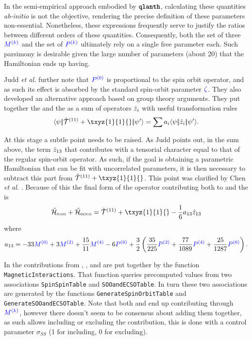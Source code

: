 \documentclass{article}
\newcommand{\codetext}[1]{{\color{BlueViolet} \texttt{#1}}}
\begin{document}
    In the semi-empirical approach embodied by $\textbf{\texttt{qlanth}}$, calculating these quantities \textit{ab-initio} is not the objective, rendering the precise definition of these parameters non-essential. Nonetheless, these expressions frequently serve to justify the ratios between different orders of these quantities. Consequently, both the set of three $\textcolor{blue}{M^{(k)}}$ and the set of $\textcolor{blue}{P^{(k)}}$ ultimately rely on a single free parameter each. Such parsimony is desirable given the large number of parameters (about 20) that the Hamiltonian ends up having.

    Judd \textit{et al.} further note that $\textcolor{blue}{P^{(0)}}$ is proportional to the spin orbit operator, and as such its effect is absorbed by the standard spin-orbit parameter $\textcolor{blue}{{\zeta}}$. They also developed an alternative approach based on group theory arguments. They put together the \soo and the \ecso as a sum of operators $\hat{z}_i$ with useful transformation rules 
    \begin{equation}
        \redbraopket{\psi}{\Txyz{1}{1}{} + \txyz{1}{1}{}}{\psi'} = \sum a_i \redbraopket{\psi}{\hat{z}_i}{\psi'}.
    \end{equation}

    At this stage a subtle point needs to be raised. As Judd points out, in the sum above, the term $\hat{z}_{13}$ that contributes with a tensorial character equal to that of the regular spin-orbit operator. As such, if the goal is obtaining a parametric Hamiltonian that can be fit with uncorrelated parameters, it is then necessary to subtract this part from $\Txyz{1}{1}{} + \txyz{1}{1}{}$. This point was clarified by Chen \textit{et al.} \cite{chen_few_2008}. Because of this the final form of the operator contributing both to \soo and the \ecso is
    \begin{equation}
        \hamSpinOtherOrbitSymbol + \hamECSOSymbol = \Txyz{1}{1}{} + \txyz{1}{1}{} - \frac{1}{6}a_{13}\op{z}_{13}
        \label{SOO ECSO sum}
    \end{equation}
    where
    \begin{equation}
        a_{13} = -33 \textcolor{blue}{M^{(0)}} + 3 \textcolor{blue}{M^{(2)}} + \frac{15}{11} \textcolor{blue}{M^{(4)}} - 6 \textcolor{blue}{P^{(0)}} + \frac{3}{2} \left(\frac{35}{225} \textcolor{blue}{P^{(2)}} + \frac{77}{1089} \textcolor{blue}{P^{(4)}} + \frac{25}{1287} \textcolor{blue}{P^{(6)}}\right).
    \end{equation}

    In \qlanth the contributions from \spinspin, \soo, and \ecso are put together by the function \codetext{MagneticInteractions}. That function queries precomputed values from two associations \codetext{SpinSpinTable} and \codetext{SOOandECSOTable}. In turn these two associations are generated by the functions \codetext{GenerateSpinOrbitTable} and \codetext{GenerateSOOandECSOTable}. Note that both \spinspin and \soo end up contributing through $\textcolor{blue}{M^{(k)}}$, however there doesn't seem to be consensus about adding them together, as such \qlanth allows including or excluding the \spinspin contribution, this is done with a control parameter $\sigma_{SS}$ (1 for including, 0 for excluding).
\end{document}
